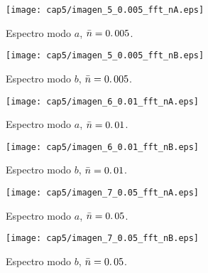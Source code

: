 \begin{figure}[ht]
\hspace*{-1.6cm}
\begin{minipage}{0.52 \linewidth}
\centering
 \texttt{[image: cap5/imagen\_5\_0.005\_fft\_nA.eps]}
\caption{Espectro modo $a$, $\bar{n}=0\ldotp 005$.}\label{fig:espectro_5_0005}
\end{minipage}
\hspace*{1.5cm}
\begin{minipage}{0.52 \linewidth}
\centering
 \texttt{[image: cap5/imagen\_5\_0.005\_fft\_nB.eps]}
\caption{Espectro modo $b$, $\bar{n}=0\ldotp 005$.}\label{fig:espectro_5_0005}
\end{minipage}
\end{figure}
\begin{figure}[ht]
\hspace*{-1.6cm}
\begin{minipage}{0.52 \linewidth}
\centering
 \texttt{[image: cap5/imagen\_6\_0.01\_fft\_nA.eps]}
\caption{Espectro modo $a$, $\bar{n}=0\ldotp 01$.}\label{fig:espectro_6_001}
\end{minipage}
\hspace*{1.5cm}
\begin{minipage}{0.52 \linewidth}
\centering
 \texttt{[image: cap5/imagen\_6\_0.01\_fft\_nB.eps]}
\caption{Espectro modo $b$, $\bar{n}=0\ldotp 01$.}\label{fig:espectro_6_001}
\end{minipage}
\end{figure}
\begin{figure}[ht]
\hspace*{-1.6cm}
\begin{minipage}{0.52 \linewidth}
\centering
 \texttt{[image: cap5/imagen\_7\_0.05\_fft\_nA.eps]}
\caption{Espectro modo $a$, $\bar{n}=0\ldotp 05$.}\label{fig:espectro_7_005}
\end{minipage}
\hspace*{1.5cm}
\begin{minipage}{0.52 \linewidth}
\centering
 \texttt{[image: cap5/imagen\_7\_0.05\_fft\_nB.eps]}
\caption{Espectro modo $b$, $\bar{n}=0\ldotp 05$.}\label{fig:espectro_7_005}
\end{minipage}
\end{figure}
